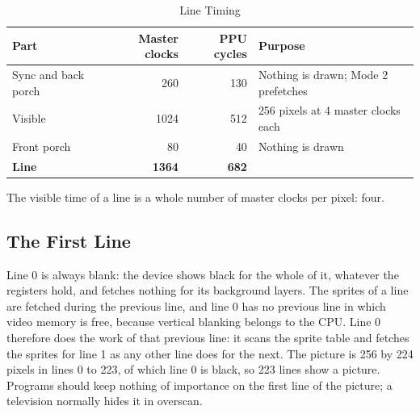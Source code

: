 \begin{table}[H]
	\centering
	\begin{tabular}{lrrl}
		\toprule
		\textbf{Part}       & \textbf{Master clocks} & \textbf{PPU cycles} & \textbf{Purpose}                    \\
		\midrule
		Sync and back porch & 260                    & 130                 & Nothing is drawn; Mode 2 prefetches \\
		Visible             & 1024                   & 512                 & 256 pixels at 4 master clocks each  \\
		Front porch         & 80                     & 40                  & Nothing is drawn                    \\
		\midrule
		\textbf{Line}       & \textbf{1364}          & \textbf{682}        &                                     \\
		\bottomrule
	\end{tabular}
	\caption{Line Timing}
	\label{tab:line-timing}
\end{table}

The visible time of a line is a whole number of master clocks per pixel: four.

\subsection{The First Line}
\label{sec:first-line}

Line 0 is always blank: the device shows black for the whole of it, whatever the registers hold, and fetches nothing
for its background layers. The sprites of a line are fetched during the previous line, and line 0 has no previous line
in which video memory is free, because vertical blanking belongs to the CPU. Line 0 therefore does the work of that
previous line: it scans the sprite table and fetches the sprites for line 1 as any other line does for the next. The
picture is 256 by 224 pixels in lines 0 to 223, of which line 0 is black, so 223 lines show a picture. Programs should
keep nothing of importance on the first line of the picture; a television normally hides it in overscan.

